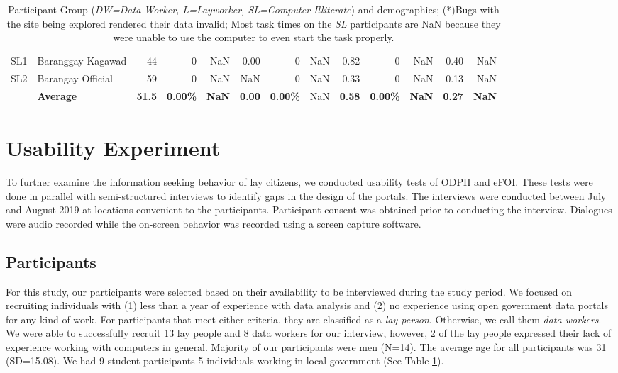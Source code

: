 \documentclass{sigchi}
\begin{document}
\begin{table}[t]
{\begin{tabular}{llrrrrrrrrrrr}
 \midrule
SL1 & Baranggay Kagawad & 44 & 0 & NaN & 0.00 & 0 & NaN & 0.82 & 0 & NaN & 0.40 & NaN \\
SL2 & Barangay Official & 59 & 0 & NaN & NaN & 0 & NaN & 0.33 & 0 & NaN & 0.13 & NaN \\
 & \textbf{Average} & \textbf{51.5} & \textbf{0.00\%} & \textbf{NaN} & \textbf{0.00} & \textbf{0.00\%} & NaN & \textbf{0.58} & \textbf{0.00\%} & \textbf{NaN} & \textbf{0.27} & \textbf{NaN}
\end{tabular}%
}
\label{tab:UsabilityExperimentID}
\caption{Participant Group (\textit{DW=Data Worker, L=Layworker, SL=Computer Illiterate}) and demographics; (*)Bugs with the site being explored rendered their data invalid; Most task times on the \textit{SL} participants are NaN because they were unable to use the computer to even start the task properly.}
\end{table}

\section{Usability Experiment}
To further examine the information seeking behavior of lay citizens, we conducted usability tests of ODPH and eFOI. These tests were done in parallel with semi-structured interviews to identify gaps in the design of the portals. The interviews were conducted between July and August 2019 at locations convenient to the participants. Participant consent was obtained prior to conducting the interview. Dialogues were audio recorded while the on-screen behavior was recorded using a screen capture software. 

\subsection{Participants}
For this study, our participants were selected based on their availability to be interviewed during the study period. We focused on recruiting individuals with (1) less than a year of experience with data analysis and (2) no experience using open government data portals for any kind of work. For participants that meet either criteria, they are classified as a \textit{lay person}. Otherwise, we call them \textit{data workers}. We were able to successfully recruit 13 lay people and 8 data workers for our interview, however, 2 of the lay people expressed their lack of experience working with computers in general. Majority of our participants were men (N=14). The average age for all participants was 31 (SD=15.08). We had 9 student participants 5 individuals working in local government (See Table \ref{tab:UsabilityExperimentID}). 
\end{document}
